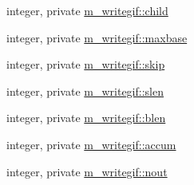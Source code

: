 \begin{DoxyCompactItemize}
\item 
integer, private \mbox{\hyperlink{namespacem__writegif_a5e1b83b3bc6e486c730832371c48f6e0}{m\+\_\+writegif\+::child}}
\item 
integer, private \mbox{\hyperlink{namespacem__writegif_ae052e1663af721294a611d19b300a8ef}{m\+\_\+writegif\+::maxbase}}
\item 
integer, private \mbox{\hyperlink{namespacem__writegif_aaf7927ca24ee3d409138c18d7d254433}{m\+\_\+writegif\+::skip}}
\item 
integer, private \mbox{\hyperlink{namespacem__writegif_ad3e590b43489ea5d2c357953adaca817}{m\+\_\+writegif\+::slen}}
\item 
integer, private \mbox{\hyperlink{namespacem__writegif_add860aadf7250b3b589b697cc90fcccf}{m\+\_\+writegif\+::blen}}
\item 
integer, private \mbox{\hyperlink{namespacem__writegif_a2a80a14e30c6ed2b0003d46a93480531}{m\+\_\+writegif\+::accum}}
\item 
integer, private \mbox{\hyperlink{namespacem__writegif_a91b7b1d0dd2ced615d855f3440716415}{m\+\_\+writegif\+::nout}}
\end{DoxyCompactItemize}
